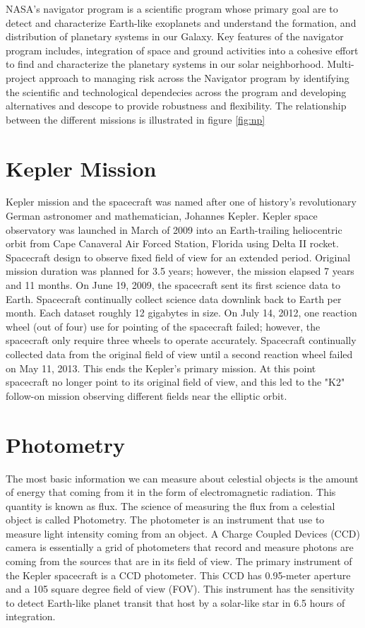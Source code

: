 NASA's navigator program is a scientific program whose primary goal are to detect and characterize Earth-like exoplanets and understand the formation, and distribution of planetary systems in our Galaxy. Key features of the navigator program includes, integration of space and ground activities into a cohesive effort to find and characterize the planetary systems in our solar neighborhood. Multi-project approach to managing risk across the Navigator program by identifying the scientific and technological dependecies across the program and developing alternatives and descope to provide robustness and flexibility. The relationship between the different missions is illustrated in figure \ref{fig:np} 


\section{Kepler Mission}

Kepler mission and the spacecraft was named after one of history's revolutionary German astronomer and mathematician, Johannes Kepler\cite{voelkel2001johannes}. Kepler space observatory was launched in March of 2009 into an Earth-trailing heliocentric orbit from Cape Canaveral Air Forced Station, Florida using Delta II rocket. Spacecraft design to observe fixed field of view for an extended period. Original mission duration was planned for 3.5 years; however, the mission elapsed 7 years and 11 months. On June 19, 2009, the spacecraft sent its first science data to Earth. Spacecraft continually collect science data downlink back to Earth per month. Each dataset roughly 12 gigabytes in size. On July 14, 2012, one reaction wheel (out of four) use for pointing of the spacecraft failed; however, the spacecraft only require three wheels to operate accurately. Spacecraft continually collected data from the original field of view until a second reaction wheel failed on May 11, 2013. This ends the Kepler's primary mission. At this point spacecraft no longer point to its original field of view, and this led to the "K2" follow-on mission \cite{2014PASP..126..398H} observing different fields near the elliptic orbit. 

\section{Photometry}

The most basic information we can measure about celestial objects is the amount of energy that coming from it in the form of electromagnetic radiation. This quantity is known as flux. The science of measuring the flux from a celestial object is called Photometry. The photometer is an instrument that use to measure light intensity coming from an object. A Charge Coupled Devices (CCD) camera is essentially a grid of photometers that record and measure photons are coming from the sources that are in its field of view. The primary instrument of the Kepler spacecraft is a CCD photometer\cite{2012PASP..124.1073P}. This CCD has 0.95-meter aperture and a 105 square degree field of view (FOV).  This instrument has the sensitivity to detect Earth-like planet transit that host by a solar-like star in 6.5 hours of integration. 

